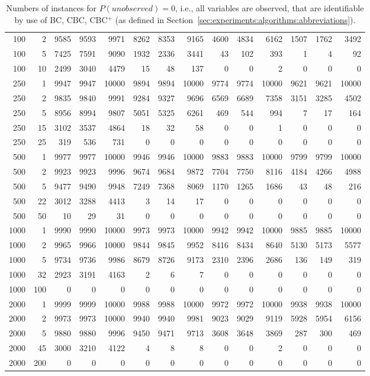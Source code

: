 {\begin{table}
\begin{center}
\begin{tabular}{|rr | rrr| rrr| rrr| rrr|}
100&2&
9585&9593&9971&8262&8353&9165&4600&4834&6162&1507&1762&3492\\
100&5&
7425&7591&9090&\cellcolor[gray]{0.85}1932&\cellcolor[gray]{0.85}2336&3441&43&102&393&1&4&92\\
100&10&
\cellcolor[gray]{0.85}2499&\cellcolor[gray]{0.85}3040&4479&15&48&137&0&0&2&0&0&0\\
\hline
250&1&
9947&9947&10000&9894&9894&10000&9774&9774&10000&9621&9621&10000\\
250&2&
9835&9840&9991&9284&9327&9696&6569&6689&7358&3151&3285&4502\\
250&5&
8956&8994&9807&5051&5325&6261&469&544&994&7&17&164\\
250&15&
\cellcolor[gray]{0.85}3102&\cellcolor[gray]{0.85}3537&4864&18&32&58&0&0&1&0&0&0\\
250&25&
319&536&731&0&0&0&0&0&0&0&0&0\\
\hline
500&1&
9977&9977&10000&9946&9946&10000&9883&9883&10000&9799&9799&10000\\
500&2&
9923&9923&9996&9674&9684&9872&7704&7750&8116&4184&4266&4988\\
500&5&
9477&9490&9948&7249&7368&8069&1170&1265&1686&43&48&216\\
500&22&
3012&3288&4413&3&14&17&0&0&0&0&0&0\\
500&50&
10&29&31&0&0&0&0&0&0&0&0&0\\
\hline
1000&1&
9990&9990&10000&9973&9973&10000&9942&9942&10000&9885&9885&10000\\
1000&2&
9965&9966&10000&9844&9845&9952&8416&8434&8640&5130&5173&5577\\
1000&5&
9734&9736&9986&8679&8726&9173&2310&2396&2686&136&149&319\\
1000&32&
2923&3191&4163&2&6&7&0&0&0&0&0&0\\
1000&100&
0&0&0&0&0&0&0&0&0&0&0&0\\
\hline
2000&1&
9999&9999&10000&9988&9988&10000&9972&9972&10000&9938&9938&10000\\
2000&2&
9973&9973&10000&9940&9940&9981&9023&9029&9119&5928&5954&6156\\
2000&5&
9880&9880&9996&9450&9471&9713&3608&3648&3869&287&300&469\\
2000&45&
3000&3210&4122&4&8&8&0&0&2&0&0&0\\
2000&200&
0&0&0&0&0&0&0&0&0&0&0&0\\
\hline\end{tabular}
  \end{center}\vspace*{-3mm}
  \caption{Numbers of instances for $P(\textit{unobserved}) = 0$, i.e., all variables are observed, that are identifiable by use of BC, CBC, CBC$^+$ (as defined in Section~\ref{sec:experiments:algorithms:abbreviations}). 
}
\end{table}}
